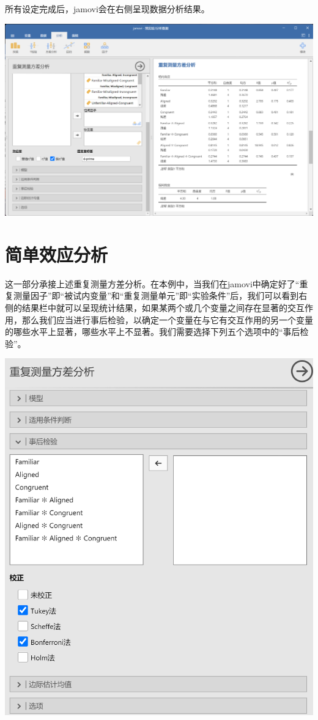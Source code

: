 \documentclass[]{ctexbook}
\theoremstyle{definition}
\theoremstyle{definition}
\theoremstyle{definition}
\theoremstyle{definition}
\theoremstyle{remark}
\begin{document}
所有设定完成后，jamovi会在右侧呈现数据分析结果。

\includegraphics{img/jamovi/rmanova-result.png}

\section{简单效应分析}\label{ux7b80ux5355ux6548ux5e94ux5206ux6790}

这一部分承接上述重复测量方差分析。在本例中，当我们在jamovi中确定好了``重复测量因子''即``被试内变量''和``重复测量单元''即``实验条件''后，我们可以看到右侧的结果栏中就可以呈现统计结果，如果某两个或几个变量之间存在显著的交互作用，那么我们应当进行事后检验，以确定一个变量在与它有交互作用的另一个变量的哪些水平上显著，哪些水平上不显著。我们需要选择下列五个选项中的``事后检验''。

\includegraphics{img/jamovi/rmanova-posthoc.png}
\end{document}
